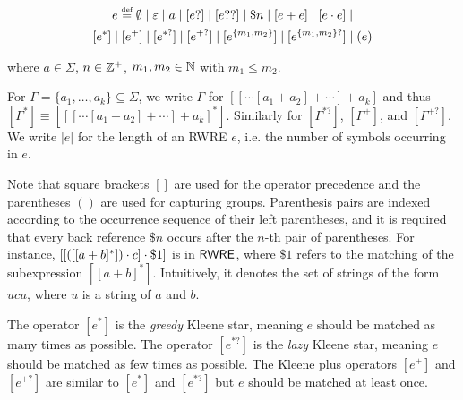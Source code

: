 \begin{definition}


    \begin{multline*}
     e \eqdef \emptyset \mid \varepsilon \mid a \mid [e?] \mid [e??] \mid \$n \mid [e + e] \mid [e \concat e] \mid \\
     [e^*] \mid [e^+] \mid [e^{*?}] \mid  [e^{+?}] \mid [e^{\{m_1,m_2\}}] \mid [e^{\{m_1,m_2\}?}] \mid (e) 
    \end{multline*}

  	where $a \in \Sigma$,  $n \in \mathbb{Z}^+$, $m_1,m_2 \in \mathbb{N}$ with $m_1 \le m_2$. 
\end{definition}
%
For $\Gamma = \{a_1, \ldots, a_k\}\subseteq \Sigma$, we write $\Gamma$ for  $[[\cdots [a_1 + a_2] + \cdots] + a_k]$ and thus $[\Gamma^\ast] \equiv [[[\cdots [a_1 + a_2] + \cdots] + a_k]^\ast]$. Similarly for $[\Gamma^{\ast?}]$, $[\Gamma^+]$, and $[\Gamma^{+?}]$. We write $|e|$ for the length of an RWRE $e$, i.e. the number of symbols occurring in $e$.

Note that square brackets $[]$ are used for the operator precedence and the parentheses $()$ are used for capturing groups. 
%
Parenthesis pairs are indexed according to the occurrence sequence of their left parentheses, and it is required that every back reference $\$ n$ occurs  %
after the $n$-th pair of parentheses. For instance, $[[([[a+b]^*]) \cdot c] \cdot \$1]$ is in ${\sf RWRE}$, where $\$1$ refers to the matching of the subexpression $[[a+b]^*]$. Intuitively, it denotes the set of strings of the form $u c u$, where $u$ is a string of $a$ and $b$. 
%

The operator $[e^*]$ is the \emph{greedy} Kleene star, meaning $e$ should be matched as many times as possible. The operator $[e^{*?}]$ is the \emph{lazy} Kleene star, meaning $e$ should be matched  as few times as possible. The Kleene plus operators $[e^+]$ and $[e^{+?}]$ are similar to $[e^*]$ and $[e^{*?}]$ but $e$ should be matched at least once.
  
